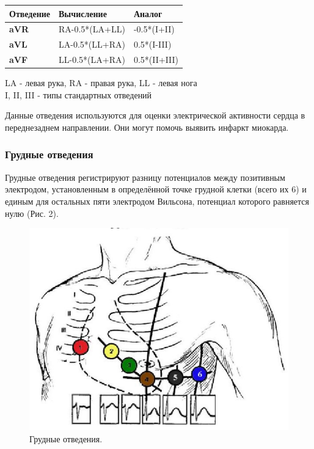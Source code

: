 \documentclass[12pt, russian]{extarticle}
\begin{document}
\begin{spacing}{1.5}
\begin{center}
\begin{tabular}{|l|l|l|}
\hline
\textbf{Отведение} & \textbf{Вычисление} & \textbf{Аналог} \\ \hline
\textbf{aVR}       & RA-0.5*(LA+LL)      & -0.5*(I+II)     \\ \hline
\textbf{aVL}       & LA-0.5*(LL+RA)      & 0.5*(I-III)     \\ \hline
\textbf{aVF}       & LL-0.5*(LA+RA)      & 0.5*(II+III)    \\ \hline
\end{tabular} \bigbreak
LA - левая рука, RA - правая рука, LL - левая нога \\
I, II, III - типы стандартных отведений
\end{center}

Данные отведения используются для оценки электрической активности сердца в переднезаднем направлении. Они могут помочь выявить инфаркт миокарда.

\subsubsection{Грудные отведения}

Грудные отведения регистрируют разницу потенциалов между позитивным электродом, установленным в определённой точке грудной клетки (всего их 6) и единым для остальных пяти электродом Вильсона, потенциал которого равняется нулю (Рис. 2).

\begin{figure}[htbp]
\centering
\includegraphics[scale=0.46]{resources/грудные отведения .png}
\caption{Грудные отведения.}
\label{fig:my_label}
\end{figure}


\end{spacing}
\end{document}

